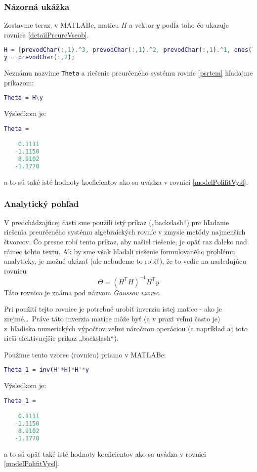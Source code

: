 \documentclass[a4paper, 10pt, ]{article}
\begin{document}
\subsubsection{Názorná ukážka}

Zostavme teraz, v MATLABe, maticu $H$ a vektor $y$ podľa toho čo ukazuje rovnica \eqref{detailPreurcVseob}.
\begin{lstlisting}[language=Matlab, numbers=none]
H = [prevodChar(:,1).^3, prevodChar(:,1).^2, prevodChar(:,1).^1, ones(length(prevodChar(:,1)), 1)];
y = prevodChar(:,2);
\end{lstlisting}
Neznámu nazvime \verb|Theta| a riešenie preurčeného systému rovníc \eqref{psrtem} hľadajme príkazom:
\begin{lstlisting}[language=Matlab, numbers=none]
Theta = H\y
\end{lstlisting}
Výsledkom je:
\begin{lstlisting}[language=Matlab, numbers=none]
Theta =

    0.1111
   -1.1150
    8.9102
   -1.1770
\end{lstlisting}
a to sú také isté hodnoty koeficientov ako sa uvádza v rovnici \eqref{modelPolifitVysl}.





\subsubsection{Analytický pohľad}

V predchádzajúcej časti sme použili istý príkaz („backslash“) pre hľadanie riešenia preurčeného systému algebraických rovníc v zmysle metódy najmenších štvorcov. Čo presne robí tento príkaz, aby našiel riešenie, je opäť raz ďaleko nad rámec tohto textu. Ak by sme však hľadali riešenie formulovaného problému analyticky, je možné ukázať (ale nebudeme to robiť), že to vedie na nasledujúcu rovnicu
\begin{equation}
    \Theta = \left( H^\mathsf T H \right)^{-1} H^\mathsf T y
\end{equation}
Táto rovnica je známa pod názvom \emph{Gaussov vzorec}.

Pri použití tejto rovnice je potrebné urobiť inverziu istej matice - ako je zrejmé\ldots \  Práve táto inverzia matice môže byť (a v praxi veľmi často je) z~hľadiska numerických výpočtov veľmi náročnou operáciou (a napríklad aj toto rieši efektívnejšie príkaz „backslash“).

Použime tento vzorec (rovnicu) priamo v MATLABe:
\begin{lstlisting}[language=Matlab, numbers=none]
Theta_1 = inv(H'*H)*H'*y
\end{lstlisting}
Výsledkom je:
\begin{lstlisting}[language=Matlab, numbers=none]
Theta_1 =

    0.1111
   -1.1150
    8.9102
   -1.1770
\end{lstlisting}
a to sú opäť také isté hodnoty koeficientov ako sa uvádza v rovnici \eqref{modelPolifitVysl}.
\end{document}
